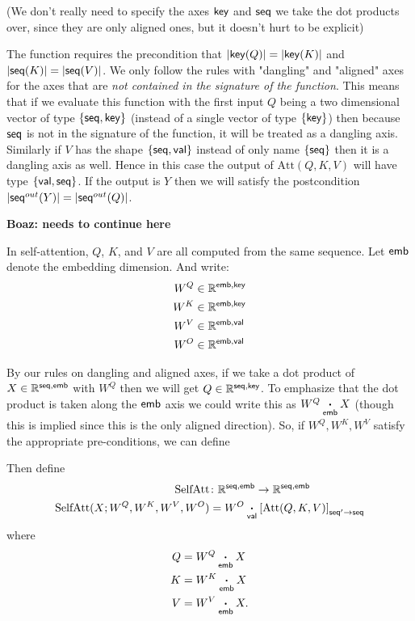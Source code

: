 \documentclass{article}
\begin{document}
(We don't really need to specify the axes $\name{key}$ and  $\name{seq}$ we take the dot products over, since they are only aligned ones, but it doesn't hurt to be explicit)

The function requires the precondition that $|\name{key}(Q)|=|\name{key}(K)|$ and $|\name{seq}(K)|=|\name{seq}(V)|$.
We only follow the rules with "dangling" and "aligned" axes for the axes that are \emph{not contained in the signature of the function}.
This means that if we evaluate this function with the first input $Q$ being  a two dimensional vector of type $\{ \name{seq} , \name{key} \}$ (instead of a single vector of type $\{ \name{key} \}$) then because $\name{seq}$ is not in the signature of the function,
it will be treated as a dangling axis.
Similarly if $V$ has the shape $\{ \name{seq} , \name{val} \}$ instead of only name $\{ \name{seq} \}$ then it is a dangling axis as well.
Hence in this case  the output of $\text{Att}(Q,K,V)$ will have type $\{ \name{val} ,\name{seq} \}$. 
If the output is $Y$ then we will satisfy the postcondition  $|\name{seq}^{out}(Y)|=|\name{seq}^{out}(Q)|$.



\textbf{Boaz: needs to continue here} 


In self-attention, $Q$, $K$, and $V$ are all computed from the same sequence.  
Let $\name{emb}$ denote the embedding dimension.
And write:
\begin{align*}
  W^Q &\in \mathbb{R}^{\name{emb}, \name{key}} \\
  W^K &\in \mathbb{R}^{\name{emb}, \name{key}} \\
  W^V &\in \mathbb{R}^{\name{emb}, \name{val}} \\
  W^O &\in \mathbb{R}^{\name{emb}, \name{val}}
\end{align*}

By our rules on dangling and aligned axes, if we take a dot product of $X \in \mathbb{R}^{\name{seq},\name{emb}}$ with $W^Q$ then we will get 
$Q \in \mathbb{R}^{\name{seq},\name{key}}$. 
To emphasize that the dot product is taken along the $\name{emb}$ axis  we could write this as $W^Q \ndot{emb} X$ (though this is implied since this is the only aligned direction).
So, if $W^Q,W^K,W^V$ satisfy the appropriate pre-conditions, we can define 


Then define
\begin{align*}
  \text{SelfAtt} &\colon \mathbb{R}^{\name{seq},\name{emb}} \rightarrow \mathbb{R}^{\name{seq},\name{emb}} \\
  \text{SelfAtt}(X; W^Q, W^K, W^V, W^O) &= W^O \ndot{val} \nmov{seq'}{seq}{\text{Att}(Q, K, V)}
\end{align*}
where
\begin{align*}
  Q &= W^Q \ndot{emb} X \\
  K &= W^K \ndot{emb} X \\
  V &= W^V \ndot{emb} X.
\end{align*}
\end{document}
